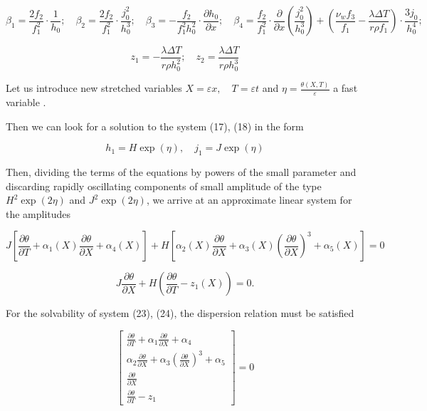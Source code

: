 \begin{equation}
\beta_1 = \frac{2 f_2}{f_1^2} \cdot \frac{1}{h_0};\quad
\beta_2 = \frac{2 f_2}{f_1^2} \cdot \frac{j_0^2}{h_0^3};\quad
\beta_3 = - \frac{f_2}{f_1^2 h_0^2} \cdot \frac{\partial h_0}{\partial x};\quad
\beta_4 = \frac{f_2}{f_1^2} \cdot \frac{\partial}{\partial x} \left( \frac{j_0^2}{h_0^3} \right)
+ \left( \frac{\nu_w f_3}{f_1} - \frac{\lambda \Delta T}{r \rho f_1} \right) \cdot \frac{3 j_0}{h_0^4};\quad
\end{equation}

\begin{equation}
z_1 = - \frac{\lambda \Delta T}{r \rho h_0^2};\quad
z_2 = \frac{\lambda \Delta T}{r \rho h_0^3}
\end{equation}

Let us introduce new stretched variables $X=\varepsilon x,\quad T=\varepsilon t$
and $\eta=\frac{\theta(X,T)}{\varepsilon}$
a fast variable
.

Then we can look for a solution to the system (17), (18) in the form

\begin{equation}
h_1 = H \exp(\eta), \quad j_1 = J \exp(\eta)
\end{equation}

Then, dividing the terms of the equations by powers of the small
parameter and discarding rapidly oscillating components of small
amplitude of the type $H^2\exp(2\eta)$ and $J^2\exp(2\eta)$, we arrive
at an approx\-imate linear system for the amplitudes

\begin{equation}
J \left[ \frac{\partial \theta}{\partial T} + \alpha_1(X) \frac{\partial \theta}{\partial X} + \alpha_4(X) \right]
+ H \left[ \alpha_2(X) \frac{\partial \theta}{\partial X} + \alpha_3(X) \left( \frac{\partial \theta}{\partial X} \right)^3 + \alpha_5(X) \right] = 0
\end{equation}

\begin{equation}
J \frac{\partial \theta}{\partial X} + H \left( \frac{\partial \theta}{\partial T} - z_1(X) \right) = 0.
\end{equation}

For the solvability of system (23), (24), the dispersion relation must
be satisfied

\begin{equation}
\left[
\begin{matrix}
\frac{\partial \theta}{\partial T} + \alpha_1 \frac{\partial \theta}{\partial X} + \alpha_4 \\
\alpha_2 \frac{\partial \theta}{\partial X} + \alpha_3 \left( \frac{\partial \theta}{\partial X} \right)^3 + \alpha_5 \\
\frac{\partial \theta}{\partial X} \\
\frac{\partial \theta}{\partial T} - z_1
\end{matrix}
\right]
= 0
\end{equation}

